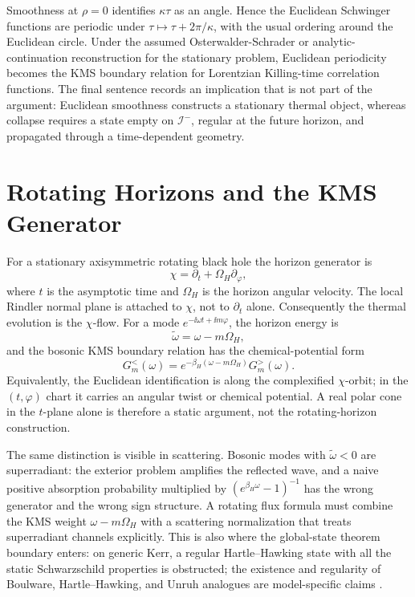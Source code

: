 Smoothness at \(\rho=0\) identifies \(\kappa\tau\) as an angle.  Hence the
Euclidean Schwinger functions are periodic under
\(\tau\mapsto\tau+2\pi/\kappa\), with the usual ordering around the Euclidean
circle.  Under the assumed Osterwalder-Schrader or analytic-continuation
reconstruction for the stationary problem, Euclidean periodicity becomes the
KMS boundary relation for Lorentzian Killing-time correlation functions.
The final sentence records an implication that is not part of the argument:
Euclidean smoothness constructs a stationary thermal object, whereas collapse
requires a state empty on \(\mathcal I^-\), regular at the future horizon,
and propagated through a time-dependent geometry.

\section{Rotating Horizons and the KMS Generator}

For a stationary axisymmetric rotating black hole the horizon generator is
\begin{equation}
  \chi=\partial_t+\Omega_H\partial_\varphi ,
  \label{eq:hawking-rotating-horizon-generator}
\end{equation}
where \(t\) is the asymptotic time and \(\Omega_H\) is the horizon angular
velocity.  The local Rindler normal plane is attached to \(\chi\), not to
\(\partial_t\) alone.  Consequently the thermal evolution is the
\(\chi\)-flow.  For a mode \(e^{-\ii\omega t+\ii m\varphi}\), the horizon
energy is
\[
  \widetilde\omega=\omega-m\Omega_H ,
\]
and the bosonic KMS boundary relation has the chemical-potential form
\begin{equation}
  G_m^<(\omega)
  =
  e^{-\beta_H(\omega-m\Omega_H)}G_m^>(\omega).
  \label{eq:hawking-rotating-kms-weight}
\end{equation}
Equivalently, the Euclidean identification is along the complexified
\(\chi\)-orbit; in the \((t,\varphi)\) chart it carries an angular twist or
chemical potential.  A real polar cone in the \(t\)-plane alone is therefore a
static argument, not the rotating-horizon construction.

The same distinction is visible in scattering.  Bosonic modes with
\(\widetilde\omega<0\) are superradiant: the exterior problem amplifies the
reflected wave, and a naive positive absorption probability multiplied by
\((e^{\beta_H\omega}-1)^{-1}\) has the wrong generator and the wrong sign
structure.  A rotating flux formula must combine the KMS weight
\(\omega-m\Omega_H\) with a scattering normalization that treats superradiant
channels explicitly.  This is also where the global-state theorem boundary
enters: on generic Kerr, a regular Hartle--Hawking state with all the static
Schwarzschild properties is obstructed; the existence and regularity of
Boulware, Hartle--Hawking, and Unruh analogues are model-specific claims
\cite{KayWald1991}.


